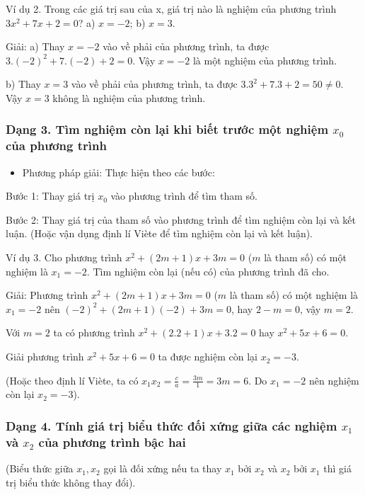 \documentclass[%
    fontsize=12pt,%
    chapterprefix=false,%
    open=right,%
    twoside=false,%
    numbers=noenddot,%
    headings=optiontohead,%
    final,%
    DIV=15,%
    parskip=half %
]{scrbook}
\begin{document}
Ví dụ 2. Trong các giá trị sau của x, giá trị nào là nghiệm của phương trình $ 3x^2 + 7x + 2 = 0 $? a) $ x = -2 $; b) $ x = 3 $.

Giải: a) Thay $ x = -2 $ vào về phải của phương trình, ta được $ 3.(-2)^2 + 7.(-2) + 2 = 0 $. Vậy $ x = -2 $ là một nghiệm của phương trình.

b) Thay $ x = 3 $ vào về phải của phương trình, ta được $ 3.3^2 + 7.3 + 2 = 50 \neq 0 $. Vậy $ x = 3 $ không là nghiệm của phương trình.
\subsubsection{Dạng 3. Tìm nghiệm còn lại khi biết trước một nghiệm $ x_0 $ của phương trình}

\begin{itemize}
  \item Phương pháp giải: Thực hiện theo các bước:
\end{itemize}

Bước 1: Thay giá trị $ x_0 $ vào phương trình để tìm tham số.


Bước 2: Thay giá trị của tham số vào phương trình để tìm nghiệm còn lại và kết luận. (Hoặc vận dụng định lí Viète để tìm nghiệm còn lại và kết luận).

Ví dụ 3. Cho phương trình $ x^2 + (2m + 1)x + 3m = 0 $ ($ m $ là tham số) có một nghiệm là $ x_1 = -2 $. Tìm nghiệm còn lại (nếu có) của phương trình đã cho.

Giải: Phương trình $ x^2 + (2m + 1)x + 3m = 0 $ ($ m $ là tham số) có một nghiệm là $ x_1 = -2 $ nên $ (-2)^2 + (2m + 1)(-2) + 3m = 0 $, hay $ 2 - m = 0 $, vậy $ m = 2 $.

Với $ m = 2 $ ta có phương trình $ x^2 + (2.2 + 1)x + 3.2 = 0 $ hay $ x^2 + 5x + 6 = 0 $.

Giải phương trình $ x^2 + 5x + 6 = 0 $ ta được nghiệm còn lại $ x_2 = -3 $.

(Hoặc theo định lí Viète, ta có $ x_1 x_2 = \frac{c}{a} = \frac{3m}{1} = 3m = 6 $. Do $ x_1 = -2 $ nên nghiệm còn lại $ x_2 = -3 $).
\subsubsection{Dạng 4. Tính giá trị biểu thức đối xứng giữa các nghiệm $ x_1 $ và $ x_2 $ của phương trình bậc hai}

(Biểu thức giữa $ x_1, x_2 $ gọi là đối xứng nếu ta thay $ x_1 $ bởi $ x_2 $ và $ x_2 $ bởi $ x_1 $ thì giá trị biểu thức không thay đổi).
\end{document}
